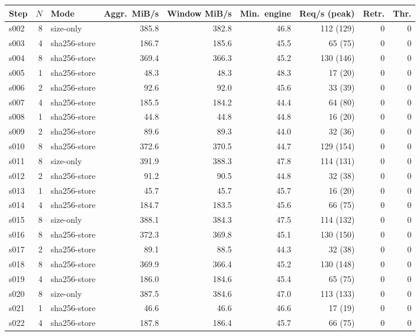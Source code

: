 
\begin{tabular}{@{}lrlrrrrrr@{}}
\toprule
Step & $N$ & Mode & Aggr.\ MiB/s & Window MiB/s & Min.\ engine & Req/s (peak) & Retr. & Thr. \\
\midrule
s002 & 8 & size-only & 385.8 & 382.8 & 46.8 & 112 (129) & 0 & 0 \\
s003 & 4 & sha256-store & 186.7 & 185.6 & 45.5 & 65 (75) & 0 & 0 \\
s004 & 8 & sha256-store & 369.4 & 366.3 & 45.2 & 130 (146) & 0 & 0 \\
s005 & 1 & sha256-store & 48.3 & 48.3 & 48.3 & 17 (20) & 0 & 0 \\
s006 & 2 & sha256-store & 92.6 & 92.0 & 45.6 & 33 (39) & 0 & 0 \\
s007 & 4 & sha256-store & 185.5 & 184.2 & 44.4 & 64 (80) & 0 & 0 \\
s008 & 1 & sha256-store & 44.8 & 44.8 & 44.8 & 16 (20) & 0 & 0 \\
s009 & 2 & sha256-store & 89.6 & 89.3 & 44.0 & 32 (36) & 0 & 0 \\
s010 & 8 & sha256-store & 372.6 & 370.5 & 44.7 & 129 (154) & 0 & 0 \\
s011 & 8 & size-only & 391.9 & 388.3 & 47.8 & 114 (131) & 0 & 0 \\
s012 & 2 & sha256-store & 91.2 & 90.5 & 44.8 & 32 (38) & 0 & 0 \\
s013 & 1 & sha256-store & 45.7 & 45.7 & 45.7 & 16 (20) & 0 & 0 \\
s014 & 4 & sha256-store & 184.7 & 183.5 & 45.6 & 66 (75) & 0 & 0 \\
s015 & 8 & size-only & 388.1 & 384.3 & 47.5 & 114 (132) & 0 & 0 \\
s016 & 8 & sha256-store & 372.3 & 369.8 & 45.1 & 130 (150) & 0 & 0 \\
s017 & 2 & sha256-store & 89.1 & 88.5 & 44.3 & 32 (38) & 0 & 0 \\
s018 & 8 & sha256-store & 369.9 & 366.4 & 45.2 & 130 (148) & 0 & 0 \\
s019 & 4 & sha256-store & 186.0 & 184.6 & 45.4 & 65 (75) & 0 & 0 \\
s020 & 8 & size-only & 387.5 & 384.6 & 47.0 & 113 (133) & 0 & 0 \\
s021 & 1 & sha256-store & 46.6 & 46.6 & 46.6 & 17 (19) & 0 & 0 \\
s022 & 4 & sha256-store & 187.8 & 186.4 & 45.7 & 66 (75) & 0 & 0 \\

\end{tabular}
